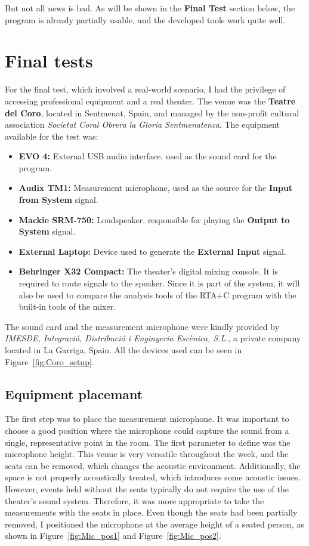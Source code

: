 But not all news is bad. As will be shown in the \textbf{Final Test} section below, the program is already partially usable, and the developed tools work quite well.

\section{Final tests}

For the final test, which involved a real-world scenario, I had the privilege of accessing professional equipment and a real theater. The venue was the \textbf{Teatre del Coro}, located in Sentmenat, Spain, and managed by the non-profit cultural association \textit{Societat Coral Obrera la Gloria Sentmenatenca}. The equipment available for the test was:

\begin{itemize}
	\item \textbf{EVO 4:} External USB audio interface, used as the sound card for the program.
	\item \textbf{Audix TM1:} Measurement microphone, used as the source for the \textbf{Input from System} signal.
	\item \textbf{Mackie SRM-750:} Loudspeaker, responsible for playing the \textbf{Output to System} signal.
	\item \textbf{External Laptop:} Device used to generate the \textbf{External Input} signal.
	\item \textbf{Behringer X32 Compact:} The theater's digital mixing console. It is required to route signals to the speaker. Since it is part of the system, it will also be used to compare the analysis tools of the RTA+C program with the built-in tools of the mixer.
\end{itemize}

The sound card and the measurement microphone were kindly provided by \textit{IMESDE, Integració, Distribució i Enginyeria Escènica, S.L.}, a private company located in La Garriga, Spain. All the devices used can be seen in Figure~\ref{fig:Coro_setup}.

\subsection{Equipment placemant}

The first step was to place the measurement microphone. It was important to choose a good position where the microphone could capture the sound from a single, representative point in the room. The first parameter to define was the microphone height. This venue is very versatile throughout the week, and the seats can be removed, which changes the acoustic environment. Additionally, the space is not properly acoustically treated, which introduces some acoustic issues. However, events held without the seats typically do not require the use of the theater's sound system. Therefore, it was more appropriate to take the measurements with the seats in place. Even though the seats had been partially removed, I positioned the microphone at the average height of a seated person, as shown in Figure~\ref{fig:Mic_pos1} and Figure~\ref{fig:Mic_pos2}.

